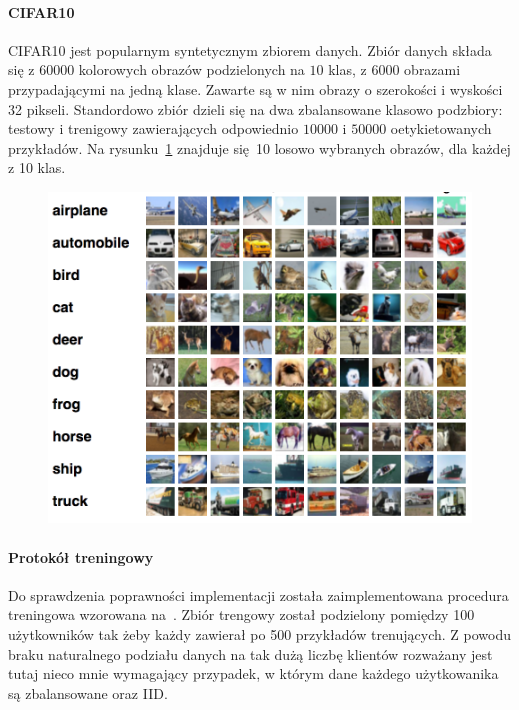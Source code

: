   \paragraph{CIFAR10}

  CIFAR10 jest popularnym syntetycznym zbiorem danych. Zbiór danych składa się z \(\num{60000}\)
  kolorowych obrazów podzielonych na \(\num{10}\) klas, z \(\num{6000}\) obrazami przypadającymi
  na jedną klase. Zawarte są w nim obrazy o szerokości i wyskości 32 pikseli. Standordowo zbiór
  dzieli się na dwa zbalansowane klasowo podzbiory: testowy i trenigowy zawierających odpowiednio
  \(10000\) i \(50000\) oetykietowanych przykładów. Na rysunku~\ref{fig:cifar10_example} znajduje się 10 losowo wybranych obrazów, dla każdej z 10 klas.

  \begin{figure}[t]
    \centering
    \includegraphics[width=1.0\textwidth]{img/cifar10_example.png}
    \label{fig:cifar10_example}
  \end{figure}

  \paragraph{Protokół treningowy}

  Do sprawdzenia poprawności implementacji została zaimplementowana procedura treningowa wzorowana
  na~\cite{mcmahan2016communicationefficient}. Zbiór trengowy został podzielony pomiędzy 100 użytkowników tak żeby każdy zawierał po 500 przykładów trenujących. Z powodu braku naturalnego podziału danych na tak dużą liczbę klientów rozważany jest tutaj nieco mnie wymagający przypadek, w którym dane każdego użytkowanika są zbalansowane oraz IID.

